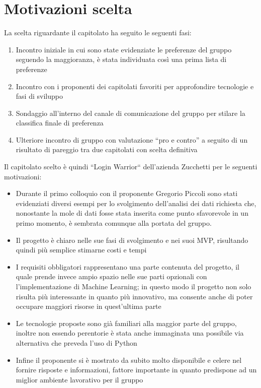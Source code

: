 \section{Motivazioni scelta}
La scelta riguardante il capitolato ha seguito le seguenti fasi:
\begin{enumerate}
	\item Incontro iniziale in cui sono state evidenziate le preferenze del gruppo seguendo la maggioranza, è stata individuata così una prima lista di preferenze
	\item Incontro con i proponenti dei capitolati favoriti per approfondire tecnologie e fasi di sviluppo
	\item Sondaggio all'interno del canale di comunicazione del gruppo per stilare la classifica finale di preferenza
	\item Ulteriore incontro di gruppo con valutazione ``pro e contro'' a seguito di un risultato di pareggio tra due capitolati con scelta definitiva
\end{enumerate}
Il capitolato scelto è quindi ``Login Warrior`` dell'azienda Zucchetti per le seguenti motivazioni:
\begin{itemize}
	\item Durante il primo colloquio con il proponente Gregorio Piccoli sono stati evidenziati diversi esempi per lo svolgimento dell'analisi dei dati richiesta che, nonostante la mole di dati fosse stata inserita come punto sfavorevole in un primo momento, è sembrata comunque alla portata del gruppo.
	\item Il progetto è chiaro nelle sue fasi di svolgimento e nei suoi MVP, risultando quindi più semplice stimarne costi e tempi
	\item I requisiti obbligatori rappresentano una parte contenuta del progetto, il quale prende invece ampio spazio nelle sue parti opzionali con l'implementazione di Machine Learning; in questo modo il progetto non solo risulta più interessante in quanto più innovativo, ma consente anche di poter occupare maggiori risorse in quest'ultima parte
	\item Le tecnologie proposte sono già familiari alla maggior parte del gruppo, inoltre non essendo perentorie è stata anche immaginata una possibile via alternativa che preveda l'uso di Python
	\item Infine il proponente si è mostrato da subito molto disponibile e celere nel fornire risposte e informazioni, fattore importante in quanto predispone ad un miglior ambiente lavorativo per il gruppo
\end{itemize}
